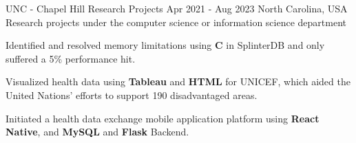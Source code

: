 

\begin{cventries}



  \cventry
    {UNC - Chapel Hill} %
    {Research Projects} %
    {Apr 2021 - Aug 2023} %
    {North Carolina, USA} %
    {Research projects under the computer science or information science department}
    {
      \begin{cvitems} %
        \item {Identified and resolved memory limitations using \textbf{C} in SplinterDB and only suffered a 5\% performance hit.}
        \item {Visualized health data using \textbf{Tableau} and \textbf{HTML} for UNICEF, which aided the United Nations' efforts to support 190 disadvantaged areas.}
        \item {Initiated a health data exchange mobile application platform using \textbf{React Native}, and \textbf{MySQL} and \textbf{Flask} Backend.}
      \end{cvitems}
    }


\end{cventries}
